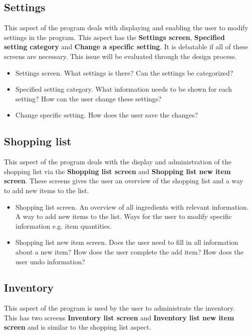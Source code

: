\subsection{Settings}
This aspect of the program deals with displaying and enabling the user to modify settings in the program. This aspect has the \textbf{Settings screen}, \textbf{Specified setting category} and \textbf{Change a specific setting}. It is debatable if all of these screens are necessary. This issue will be evaluated through the design process.

\begin{itemize}
	\item Settings screen. 
		\subitem What settings is there?
		\subitem Can the settings be categorized?
	\item Specified setting category.
		\subitem What information needs to be shown for each setting?
		\subitem How can the user change these settings?
	\item Change specific setting.
		\subitem How does the user save the changes?
\end{itemize}  

\subsection{Shopping list}
This aspect of the program deals with the display and administration of the shopping list via the \textbf{Shopping list screen} and \textbf{Shopping list new item screen}. These screens gives the user an overview of the shopping list and a way to add new items to the list.

\begin{itemize}
	\item Shopping list screen.
		\subitem An overview of all ingredients with relevant information.
		\subitem A way to add new items to the list.
		\subitem Ways for the user to modify specific information e.g. item quantities.
	\item Shopping list new item screen.
		\subitem Does the user need to fill in all information about a new item?
		\subitem How does the user complete the add item?
		\subitem How does the user undo information? 
\end{itemize}

\subsection{Inventory}
This aspect of the program is used by the user to administrate the inventory. This has two screens
\textbf{Inventory list screen} and \textbf{Inventory list new item screen} and is similar to the shopping list aspect. 
    
